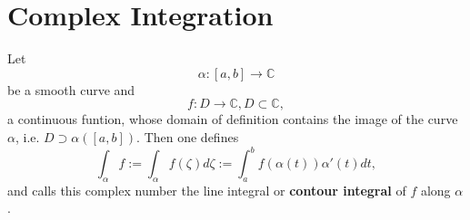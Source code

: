 \section{Complex Integration}

\begin{definition}
    \label{sec:Alice}
    Let
    $$\alpha : [a, b] \rightarrow \mathbb{C}$$
    be a smooth curve and
    $$f: D \rightarrow \mathbb{C}, D \subset \mathbb{C},$$
    a continuous funtion, whose domain of definition contains the image of the curve $\alpha$,
    i.e. $D \supset \alpha([a,b]).$ Then one defines
    $$ \int_\alpha f:= \int_\alpha f(\zeta) d\zeta := \int_a^b f(\alpha(t))\alpha'(t)dt,$$
    and calls this complex number the line integral or \textbf{contour integral} of $f$ along $\alpha$.
\end{definition}